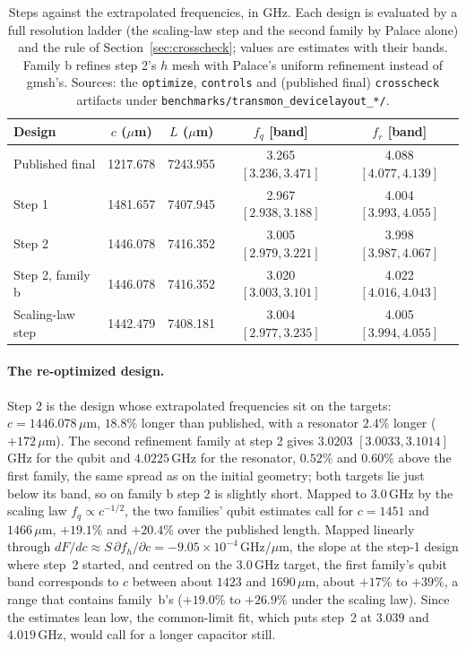 \documentclass{anvil-paper}
\begin{document}
\begin{table}[htbp]
  \centering
  \caption{Steps against the extrapolated frequencies, in GHz. Each design
  is evaluated by a full resolution ladder (the scaling-law step and the
  second family by Palace alone) and the rule of
  Section~\ref{sec:crosscheck}; values are estimates with their bands.
  Family b refines step 2's $h$ mesh with Palace's uniform refinement
  instead of gmsh's. Sources: the \texttt{optimize}, \texttt{controls} and
  (published final) \texttt{crosscheck} artifacts under
  \texttt{benchmarks/transmon\_devicelayout\_*/}.}
  \label{tab:newton-conv}
  \footnotesize
  \begin{tabular}{@{}lcccc@{}}
    \toprule
    Design & $c$ ($\mu$m) & $L$ ($\mu$m) & $f_q$ [band] & $f_r$ [band] \\
    \midrule
    Published final & 1217.678 & 7243.955 & 3.265 $[3.236, 3.471]$ & 4.088 $[4.077, 4.139]$ \\
    Step 1 & 1481.657 & 7407.945 & 2.967 $[2.938, 3.188]$ & 4.004 $[3.993, 4.055]$ \\
    Step 2 & 1446.078 & 7416.352 & 3.005 $[2.979, 3.221]$ & 3.998 $[3.987, 4.067]$ \\
    Step 2, family b & 1446.078 & 7416.352 & 3.020 $[3.003, 3.101]$ & 4.022 $[4.016, 4.043]$ \\
    Scaling-law step & 1442.479 & 7408.181 & 3.004 $[2.977, 3.235]$ & 4.005 $[3.994, 4.055]$ \\
    \bottomrule
  \end{tabular}
\end{table}

\paragraph{The re-optimized design.}
Step 2 is the design whose extrapolated frequencies sit on the targets:
$c = 1446.078\,\mu$m, $18.8\%$ longer than published, with a resonator
$2.4\%$ longer ($+172\,\mu$m). The second refinement family at step 2 gives
$3.0203$ $[3.0033, 3.1014]$\,GHz for the qubit and $4.0225$\,GHz for the
resonator, $0.52\%$ and $0.60\%$ above the first family, the same spread as
on the initial geometry; both targets lie just below its band, so on family
b step 2 is slightly short. Mapped to $3.0$\,GHz by the scaling law $f_q
\propto c^{-1/2}$, the two families' qubit estimates call for $c = 1451$ and
$1466\,\mu$m, $+19.1\%$ and $+20.4\%$ over the published length. Mapped
linearly through $dF/dc \approx
S\,\partial f_h/\partial c = -9.05\times10^{-4}$\,GHz/$\mu$m, the slope at
the step-1 design where step~2 started, and centred on the $3.0$\,GHz
target, the first family's qubit band corresponds to $c$ between about
$1423$ and $1690\,\mu$m, about $+17\%$ to $+39\%$, a range that contains
family~b's ($+19.0\%$ to $+26.9\%$ under the scaling law). Since the estimates lean low, the common-limit
fit, which puts step~2 at $3.039$ and $4.019$\,GHz, would call for a longer
capacitor still.
\end{document}
